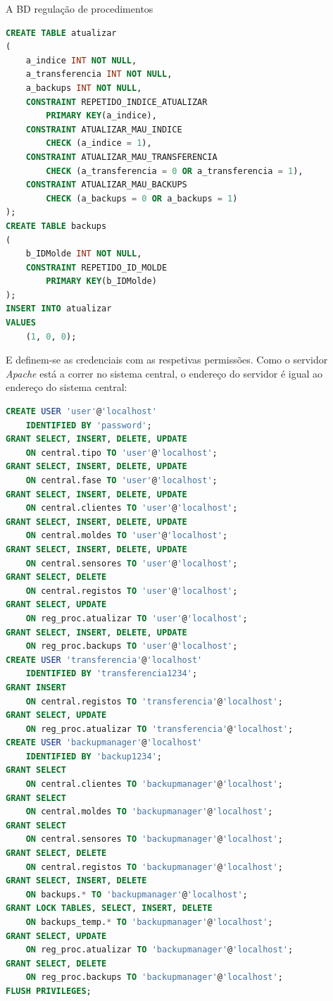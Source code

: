 \documentclass[11pt,twoside,a4paper]{report}
\begin{document}
A BD regulação de procedimentos
\begin{lstlisting}[language = SQL]
CREATE TABLE atualizar
(
	a_indice INT NOT NULL,
	a_transferencia INT NOT NULL,
	a_backups INT NOT NULL,
	CONSTRAINT REPETIDO_INDICE_ATUALIZAR
		PRIMARY KEY(a_indice),
	CONSTRAINT ATUALIZAR_MAU_INDICE
		CHECK (a_indice = 1),
	CONSTRAINT ATUALIZAR_MAU_TRANSFERENCIA
		CHECK (a_transferencia = 0 OR a_transferencia = 1),
	CONSTRAINT ATUALIZAR_MAU_BACKUPS
		CHECK (a_backups = 0 OR a_backups = 1)
);
CREATE TABLE backups
(
	b_IDMolde INT NOT NULL,
	CONSTRAINT REPETIDO_ID_MOLDE
		PRIMARY KEY(b_IDMolde)
);
INSERT INTO atualizar
VALUES
	(1, 0, 0);
\end{lstlisting}
E definem-se as credenciais com as respetivas permissões. Como o servidor \textit{Apache} está a correr no sistema central, o endereço do servidor é igual ao endereço do sistema central:
\begin{lstlisting}[language = SQL]
CREATE USER 'user'@'localhost'
	IDENTIFIED BY 'password';
GRANT SELECT, INSERT, DELETE, UPDATE
	ON central.tipo TO 'user'@'localhost';
GRANT SELECT, INSERT, DELETE, UPDATE
	ON central.fase TO 'user'@'localhost';
GRANT SELECT, INSERT, DELETE, UPDATE
	ON central.clientes TO 'user'@'localhost';
GRANT SELECT, INSERT, DELETE, UPDATE
	ON central.moldes TO 'user'@'localhost';
GRANT SELECT, INSERT, DELETE, UPDATE
	ON central.sensores TO 'user'@'localhost';
GRANT SELECT, DELETE
	ON central.registos TO 'user'@'localhost';
GRANT SELECT, UPDATE
	ON reg_proc.atualizar TO 'user'@'localhost';
GRANT SELECT, INSERT, DELETE, UPDATE
	ON reg_proc.backups TO 'user'@'localhost';
CREATE USER 'transferencia'@'localhost'
	IDENTIFIED BY 'transferencia1234';
GRANT INSERT
	ON central.registos TO 'transferencia'@'localhost';
GRANT SELECT, UPDATE
	ON reg_proc.atualizar TO 'transferencia'@'localhost';
CREATE USER 'backupmanager'@'localhost'
	IDENTIFIED BY 'backup1234';
GRANT SELECT
	ON central.clientes TO 'backupmanager'@'localhost';
GRANT SELECT
	ON central.moldes TO 'backupmanager'@'localhost';
GRANT SELECT
	ON central.sensores TO 'backupmanager'@'localhost';
GRANT SELECT, DELETE
	ON central.registos TO 'backupmanager'@'localhost';
GRANT SELECT, INSERT, DELETE
	ON backups.* TO 'backupmanager'@'localhost';
GRANT LOCK TABLES, SELECT, INSERT, DELETE
	ON backups_temp.* TO 'backupmanager'@'localhost';
GRANT SELECT, UPDATE
	ON reg_proc.atualizar TO 'backupmanager'@'localhost';
GRANT SELECT, DELETE
	ON reg_proc.backups TO 'backupmanager'@'localhost';
FLUSH PRIVILEGES;
\end{lstlisting}
\end{document}
